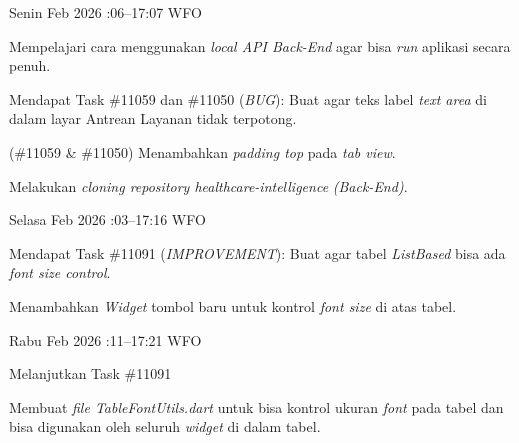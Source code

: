 \renewcommand{\reportmonth}{Februari}
\renewcommand{\signaturedate}{2 Maret 2026}

\begin{logtable}

    {
        Senin  Feb 2026 :06--17:07 \linebreak
        WFO
    }{
        \begin{loglist}
            \item Mempelajari cara menggunakan \textit{local API Back-End} agar bisa \textit{run}
            aplikasi secara penuh.
            \item Mendapat Task \#11059 dan \#11050 (\textit{BUG}): Buat agar teks label
            \textit{text area} di dalam layar Antrean Layanan tidak terpotong.
        \end{loglist}
    }{
        \begin{logwork}
            \item (\#11059 \& \#11050) Menambahkan \textit{padding top} pada \textit{tab view}.
            \item Melakukan \textit{cloning repository healthcare-intelligence}
            \textit{(Back-End)}.
        \end{logwork}
    }

    {
        Selasa  Feb 2026 :03--17:16 \linebreak
        WFO
    }{
        \begin{loglist}
            \item Mendapat Task \#11091 (\textit{IMPROVEMENT}): Buat agar tabel
            \textit{ListBased} bisa ada \textit{font size control}.
        \end{loglist}
    }{
        \begin{logwork}
            \item Menambahkan \textit{Widget} tombol baru untuk kontrol \textit{font size} di
            atas tabel.
        \end{logwork}
    }

    {
        Rabu  Feb 2026 :11--17:21 \linebreak
        WFO
    }{
        \begin{loglist}
            \item Melanjutkan Task \#11091
        \end{loglist}
    }{
        \begin{logwork}
            \item Membuat \textit{file TableFontUtils.dart} untuk bisa kontrol ukuran
            \textit{font} pada tabel dan bisa digunakan oleh seluruh \textit{widget} di
            dalam tabel.
        \end{logwork}
    }


\end{logtable}
